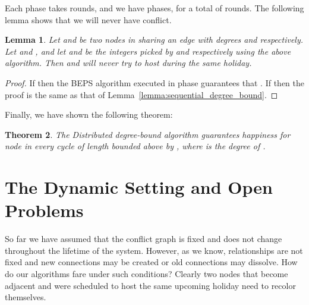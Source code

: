 \documentclass[11pt]{article}
\newtheorem{theorem}{Theorem}[section]
\newtheorem{lemma}[theorem]{Lemma}
\begin{document}


Each phase takes  rounds, and we have  phases, for a total of  rounds. The following lemma shows that we will never have conflict.

\begin{lemma}\label{lemma:dist_degree_bound}
Let  and  be two nodes in  sharing an edge with degrees  and  respectively. Let  and , and let  and  be the integers picked by  and  respectively using the above algorithm. Then  and  will never try to host during the same holiday.
\end{lemma}
\begin{proof}
If  then the BEPS algorithm executed in phase  guarantees that . If  then the proof is the same as that of Lemma~\ref{lemma:sequential_degree_bound}.
\end{proof}

Finally, we have shown the following theorem:

\begin{theorem}
The Distributed degree-bound algorithm guarantees happiness for node
 in every cycle of length bounded above by , where
 is the degree of .

\end{theorem}

\section{The Dynamic Setting and Open Problems}
\label{s:dynamic}

So far we have assumed that the conflict graph is fixed and does not change throughout the lifetime of the system. However, as we know, relationships are not fixed and new connections may be created or old connections may dissolve. How do our algorithms fare under such conditions? Clearly two nodes that become adjacent and were scheduled to host the same upcoming holiday need to recolor themselves.
\end{document}
